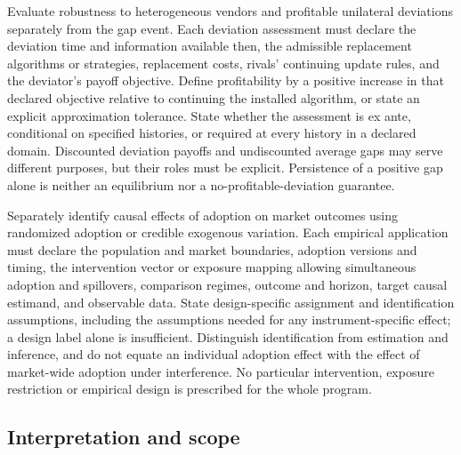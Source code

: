 \documentclass[11pt,a4paper]{article}
\begin{document}
Evaluate robustness to heterogeneous vendors and profitable unilateral deviations separately from the gap event. Each deviation assessment must declare the deviation time and information available then, the admissible replacement algorithms or strategies, replacement costs, rivals' continuing update rules, and the deviator's payoff objective. Define profitability by a positive increase in that declared objective relative to continuing the installed algorithm, or state an explicit approximation tolerance. State whether the assessment is ex ante, conditional on specified histories, or required at every history in a declared domain. Discounted deviation payoffs and undiscounted average gaps may serve different purposes, but their roles must be explicit. Persistence of a positive gap alone is neither an equilibrium nor a no-profitable-deviation guarantee.

Separately identify causal effects of adoption on market outcomes using randomized adoption or credible exogenous variation. Each empirical application must declare the population and market boundaries, adoption versions and timing, the intervention vector or exposure mapping allowing simultaneous adoption and spillovers, comparison regimes, outcome and horizon, target causal estimand, and observable data. State design-specific assignment and identification assumptions, including the assumptions needed for any instrument-specific effect; a design label alone is insufficient. Distinguish identification from estimation and inference, and do not equate an individual adoption effect with the effect of market-wide adoption under interference. No particular intervention, exposure restriction or empirical design is prescribed for the whole program.

\subsection*{Interpretation and scope}
\end{document}
